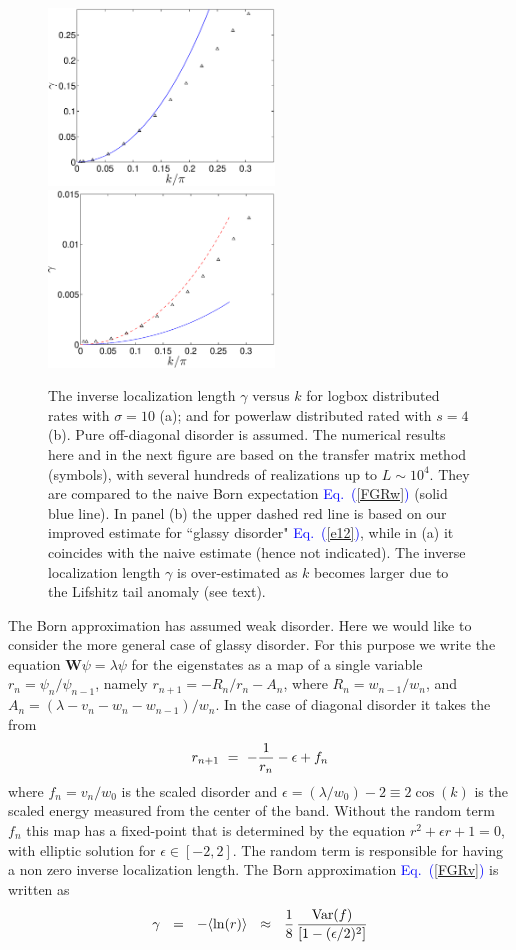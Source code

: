 \documentclass[onecolumn,fleqn,notitlepage,secnumarabic]{revtex4}
\newcommand{\Eq}[1]{\textcolor{blue}{Eq.\!\!~(\ref{#1})}}
\newcommand{\be}[1]{\begin{eqnarray}\ifthenelse{#1=-1}{\nonumber}{\ifthenelse{#1=0}{}{\label{e#1}}}}
\newcommand{\ee}{\end{eqnarray}}
\newcommand{\eeq}{\ee}
\begin{document}
\begin{figure}[h]

\includegraphics[width=6cm]{gammaVSkBX}
\includegraphics[width=6cm]{gammaVSkPL}

\caption{The inverse localization length $\gamma$ versus $k$ 
for logbox distributed rates with $\sigma=10$ (a);   
and for powerlaw distributed rated with $s=4$ (b).  
Pure off-diagonal disorder is assumed.
The numerical results here and in the next figure 
are based on the transfer matrix method (symbols), 
with several hundreds of realizations up to ${L\sim10^4}$.
They are compared to the naive Born expectation \Eq{FGRw} (solid blue line).
In panel (b) the upper dashed red line is based on our improved 
estimate for ``glassy disorder"  \Eq{e12}, 
while in (a) it coincides with the naive estimate (hence not indicated). 
The inverse localization length $\gamma$ is over-estimated 
as $k$ becomes larger due to the Lifshitz tail anomaly (see text).  
}
\label{f2}
\end{figure}

%
The Born approximation has assumed weak disorder. 
Here we would like to consider the more general case 
of glassy disorder. For this purpose we write 
the equation ${\bm{W}\psi = \lambda \psi}$ for the eigenstates 
as a map of a single variable ${r_n=\psi_{n}/\psi_{n-1}}$,   
namely  ${r_{n+1} = -R_n/r_n - A_n}$,  
where ${R_n=w_{n-1}/w_{n}}$, and ${A_n = (\lambda-v_n-w_n-w_{n-1})/w_n}$.
In the case of diagonal disorder it takes the from  
%
\be{8}
r_{n+1} \ = \ -\frac{1}{r_n} - \epsilon + f_n
\eeq
%
where $f_n=v_n/w_0$ is the scaled disorder 
and $\epsilon=(\lambda/w_0){-}2 \equiv 2\cos(k)$ 
is the scaled energy 
measured from the center of the band.
%
Without the random term $f_n$ this map has a fixed-point 
that is determined by the equation ${ r^2+\epsilon r +1=0 }$, 
with elliptic solution for ${\epsilon\in[-2,2]}$. 
The random term is responsible for having 
a non zero inverse localization length.
The Born approximation \Eq{FGRv} is written as  
%
\be{9}
\gamma \ \ = \ \ -\langle \ln(r) \rangle \ \ \approx \ \ \frac{1}{8} \, \frac{ \mbox{Var}(f)}{\left[1-(\epsilon/2)^2\right]}
\eeq
% 
\end{document}
